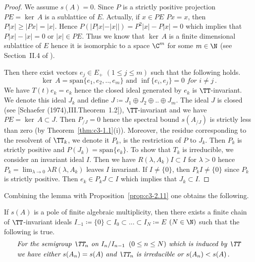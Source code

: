 \begin{proof}
	We assume $s(A) = 0$. 
	Since $P$ is a strictly positive projection $PE = \ker\,A$ is a sublattice of $E$. 
	Actually, if $x \in PE$ \ie  $Px = x$, then $P|x| \geq |Px| = |x|$. 
	Hence $P(|P|x|-|x||) = P^{2}|x| - P|x| = 0$ which implies that $P|x| - |x| = 0$ or $|x| \in PE$.
	Thus we know that $\ker\,A$ is a finite dimensional sublattice of $E$ hence it is isomorphic to a space $\C ^{m}$ for some $m \in \N$ (see Section~II.4 of \citet{schaefer:1974}). 
	
	Then there exist vectors $e_{j} \in E_{+}$ $(1\leq j\leq m)$ such that the following holds.
	\begin{equation}\label{eq:c3-3.18}
		\ker\,A = \mathrm{span} \{e_{1},e_{2}, .. ,e_{m}\} \text{ and } \inf\{e_{i},e_{j}\} = 0 \textit{ for }  i \neq j\,.
	\end{equation}
	We have $T(t)e_{k} = e_{k}$ hence the closed ideal generated by $e_{k}$ is $\TT$-invariant. 
	We denote this ideal $J_{k}$ and define $J\coloneqq  J_{1}\oplus J_{2}\oplus .. \oplus J_{m}$.
	The ideal $J$ is closed (see [Schaefer (1974),III.Theorem~1.2]), $\TT$-invariant and we have $PE = \ker\,A \subset J$. 
	Then $P_{/J} = 0$ hence the spectral bound $s(A_{/J})$
%
	is strictly less than zero (by Theorem~\ref{thm:c3-1.1}(i)). 
	Moreover, the residue corresponding to the resolvent of $\TT_{k}$, we denote it $P_{k}$, is the restriction of $P$ to $J_{k}$.
	Then $P_{k}$ is strictly positive and $P(J_{k}) = \mathrm{span}\{e_{k}\}$. 
	To show that $T_{k}$ is irreducible, we consider an invariant ideal $I$. 
	Then we have $R(\lambda,A_{k})I \subset I$ for $\lambda > 0$ hence $P_{k} = \lim_{\lambda \to 0}\lambda R(\lambda,A_{k})$ leaves $I$ invariant. 
	If $I \neq \{0\}$, then $P_{k}I \neq \{0\}$ since $P_{k}$ is strictly positive. 
	Then $e_{k} \in P_{k}J \subset I$ which implies that $J_{k} \subset I$.
\end{proof}

Combining the lemma with Proposition~\ref{prop:c3-2.11} one obtains the following.

If $s(A)$ is a pole of finite algebraic multiplicity, then there exists a finite chain of $\TT$-invariant ideals $I_{-1} \coloneqq  \{0\} \subset I_{0}\subset ... \subset I_{N} \coloneqq  E$ $(N\in\N)$ such that the following is true.
\begin{equation}\label{eq:c3-3.19}
	\begin{aligned}
	&\textit{For the semigroup $\TT_{n}$ on $I_{n}/I_{n-1}\, \ (0 \leq n \leq N)$ which is induced by $\TT$}
		\\
	& \textit{we have either $s(A_{n}) = s(A)$ and $\TT_{n}$ is irreducible or $s(A_{n}) < s(A)$}\,.
	\end{aligned}
\end{equation}

